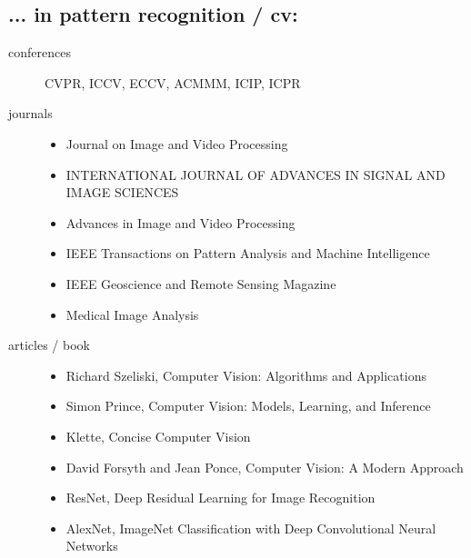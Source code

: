 \documentclass{article}
\begin{document}
\subsection*{... in pattern recognition / cv:}
\begin{description}
    \item[conferences] CVPR, ICCV, ECCV, ACMMM, ICIP, ICPR
    \item[journals] \hfill
    \begin{itemize}
        \item Journal on Image and Video Processing
        \item INTERNATIONAL JOURNAL OF ADVANCES IN SIGNAL AND IMAGE SCIENCES
        \item Advances in Image and Video Processing
        \item IEEE Transactions on Pattern Analysis and Machine Intelligence
        \item IEEE Geoscience and Remote Sensing Magazine
        \item Medical Image Analysis
    \end{itemize}
    \item[articles / book] \hfill
    \begin{itemize}
        \item Richard Szeliski, Computer Vision: Algorithms and Applications
        \item Simon Prince, Computer Vision: Models, Learning, and Inference
        \item Klette, Concise Computer Vision
        \item David Forsyth and Jean Ponce, Computer Vision: A Modern Approach
        \item ResNet, Deep Residual Learning for Image Recognition
        \item AlexNet, ImageNet Classification with Deep Convolutional Neural Networks
    \end{itemize} 
\end{description}

\break
\end{document}
